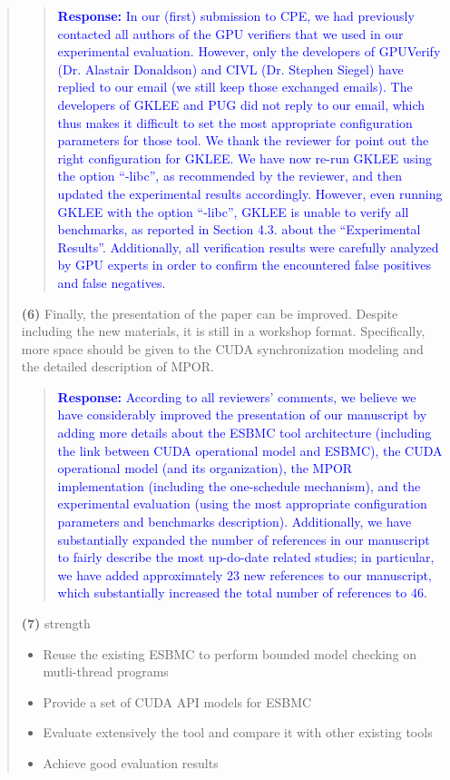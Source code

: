 \documentclass[11pt]{article}
\begin{document}
\begin{quote}
\begin{quote}
\textcolor{blue}{\textbf{Response:} In our (first) submission to CPE, we had previously contacted all authors of the GPU verifiers that we used in our experimental evaluation. However, only the developers of GPUVerify (Dr. Alastair Donaldson) and CIVL (Dr. Stephen Siegel) have replied to our email (we still keep those exchanged emails). The developers of GKLEE and PUG did not reply to our email, which thus makes it difficult to set the most appropriate configuration parameters for those tool. We thank the reviewer for point out the right configuration for GKLEE. We have now re-run GKLEE using the option ``-libc'', as recommended by the reviewer, and then updated the experimental results accordingly. However, even running GKLEE with the option ``-libc'', GKLEE is unable to verify all benchmarks, as reported in Section 4.3. about the ``Experimental Results''. Additionally, all verification results were carefully analyzed by GPU experts in order to confirm the encountered false positives and false negatives.}
\end{quote}

{\bf (6)} Finally, the presentation of the paper can be improved. Despite including the new materials, it is still in a workshop format. Specifically, more space should be given to the CUDA synchronization modeling and the detailed description of MPOR.

\begin{quote}
\textcolor{blue}{\textbf{Response:} According to all reviewers' comments, we believe we have considerably improved the presentation of our manuscript by adding more details about the ESBMC tool architecture (including the link between CUDA operational model and ESBMC), the CUDA operational model (and its organization), the MPOR implementation (including the one-schedule mechanism), and the experimental evaluation (using the most appropriate configuration parameters and benchmarks description). Additionally, we have substantially expanded the number of references in our manuscript to fairly describe the most up-do-date related studies; in particular, we have added approximately $23$ new references to our manuscript, which substantially increased the total number of references to $46$.}
\end{quote}

{\bf (7)} strength

\begin{itemize}
\item Reuse the existing ESBMC to perform bounded model checking on mutli-thread programs
\item Provide a set of CUDA API models for ESBMC
\item Evaluate extensively the tool and compare it with other existing tools
\item Achieve good evaluation results
\end{itemize}


\end{quote}
\end{document}
